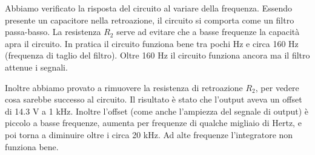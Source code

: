 Abbiamo verificato la risposta del circuito al variare della frequenza. Essendo presente un capacitore
nella retroazione, il circuito si comporta come un filtro passa-basso. La resistenza $R_2$ serve ad evitare che a basse
frequenze la capacità apra il circuito. In pratica il circuito funziona bene tra pochi Hz e circa 160 Hz (frequenza di taglio
del filtro). Oltre 160 Hz il circuito funziona ancora ma il filtro attenue i segnali.

Inoltre abbiamo provato a rimuovere la resistenza di retroazione $R_2$, per vedere cosa sarebbe successo al circuito.
Il risultato è stato che l'output aveva un offset di 14.3 V a 1 kHz. Inoltre l'offset (come anche l'ampiezza del segnale
di output) è piccolo a basse frequenze, aumenta per frequenze di qualche migliaio di Hertz,
e poi torna a diminuire oltre i circa 20 kHz. Ad alte frequenze l'integratore non funziona bene.


